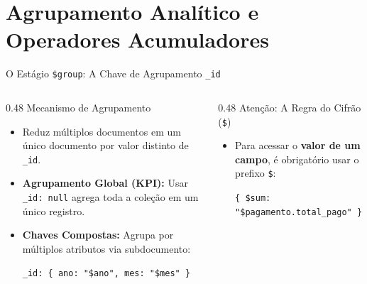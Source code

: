\section[Agrupamento Analítico e Acumuladores]{Agrupamento Analítico e Operadores Acumuladores}

\begin{frame}[fragile]{O Estágio \texttt{\$group}: A Chave de Agrupamento \texttt{\_id}}
	\vspace{0.1cm}
	\begin{columns}[t,onlytextwidth]
		
		\begin{column}{0.48\textwidth}
			\alert{Mecanismo de Agrupamento}\par
			\footnotesize
			\begin{itemize}
				\item Reduz múltiplos documentos em um único documento por valor distinto de \lstinline[language=mongosh, basicstyle=\footnotesize\ttfamily]|_id|.
				
				\item \textbf{Agrupamento Global (KPI):} Usar \lstinline[language=mongosh, basicstyle=\footnotesize\ttfamily]|_id: null| agrega toda a coleção em um único registro.
				
				\item \textbf{Chaves Compostas:} Agrupa por múltiplos atributos via subdocumento:
				
				\vspace{0.15cm}
				\centering
				\lstinline[language=mongosh, basicstyle=\scriptsize\ttfamily]|_id: { ano: "$ano", mes: "$mes" }|
			\end{itemize}
		\end{column}
		
		\begin{column}{0.48\textwidth}
			\alert{Atenção: A Regra do Cifrão (\texttt{\$})}\par
			\footnotesize
			\begin{itemize}
				\item Para acessar o \textbf{valor de um campo}, é obrigatório usar o prefixo \texttt{\$}:
				
				\vspace{0.15cm}
				\centering
				\lstinline[language=mongosh, basicstyle=\footnotesize\ttfamily]|{ $sum: "$pagamento.total_pago" }|
				

\end{itemize}
\end{column}
\end{columns}
\end{frame}
